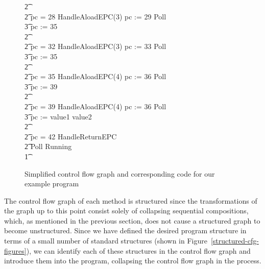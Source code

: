 \begin{figure}
\begin{center}
\begin{minipage}{0.6\linewidth}
\begin{circus}
        \t2 {} \cdots {} \\
        \t2 {} \circelse pc = 28 \circthen HandleAloadEPC(3) \circseq pc := 29 \circseq Poll \circseq \cdots \circseq \\
        \t3 pc := 35 \\
        \t2 {} \cdots {} \\
        \t2 {} \circelse pc = 32 \circthen HandleAloadEPC(3) \circseq pc := 33 \circseq Poll \circseq \cdots \circseq \\
        \t3 pc := 35 \\
        \t2 {} \cdots {} \\
        \t2 {} \circelse pc = 35 \circthen HandleAloadEPC(4) \circseq pc := 36 \circseq Poll \circseq \cdots \circseq \\
        \t3 pc := 39 \\
        \t2 {} \cdots {} \\
        \t2 {} \circelse pc = 39 \circthen HandleAloadEPC(4) \circseq pc := 36 \circseq Poll \circseq \cdots \circseq \\
        \t3 pc := \IF value1 \leq value2   \\
        \t2 {} \cdots {} \\
        \t2 {} \circelse pc = 42 \circthen HandleReturnEPC \\
        \t2 \circfi \circseq Poll \circseq Running \\
        \t1 \circfi
      \end{circus}
    \end{minipage}
  \end{center}
  \caption{Simplified control flow graph and corresponding code for our example
    program}
  \label{example-simplified-control-flow-graph-figure}
\end{figure}


The control flow graph of each method is structured since the
transformations of the graph up to this point consist solely of
collapsing sequential compositions, which, as mentioned in the
previous section, does not cause a structured graph to become
unstructured.
Since we have defined the desired program structure in terms of a
small number of standard structures (shown in
Figure~\ref{structured-cfg-figures}), we can identify each of these
structures in the control flow graph and introduce them into the
program, collapsing the control flow graph in the process.

